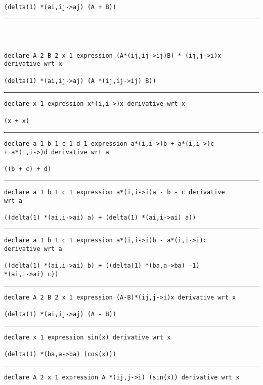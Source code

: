 \documentclass[12pt, a4paper]{report}
\begin{document}
\begin{multicols}{2}
\begin{verbatim}
(delta(1) *(ai,ij->aj) (A + B))
\end{verbatim}
\vspace{-20pt} \rule[-10pt]{\columnwidth}{0.1pt} 
\begin{verbatim}



declare A 2 B 2 x 1 expression (A*(ij,ij->ij)B) * (ij,j->i)x 
derivative wrt x

(delta(1) *(ai,ij->aj) (A *(ij,ij->ij) B))
\end{verbatim}
\vspace{-20pt} \rule[-10pt]{\columnwidth}{0.1pt} 
\begin{verbatim}
declare x 1 expression x*(i,i->)x derivative wrt x

(x + x)
\end{verbatim}
\vspace{-20pt} \rule[-10pt]{\columnwidth}{0.1pt} 
\begin{verbatim}
declare a 1 b 1 c 1 d 1 expression a*(i,i->)b + a*(i,i->)c 
+ a*(i,i->)d derivative wrt a

((b + c) + d)
\end{verbatim}
\vspace{-20pt} \rule[-10pt]{\columnwidth}{0.1pt} 
\begin{verbatim}
declare a 1 b 1 c 1 expression a*(i,i->i)a - b - c derivative 
wrt a

((delta(1) *(ai,i->ai) a) + (delta(1) *(ai,i->ai) a))
\end{verbatim}
\vspace{-20pt} \rule[-10pt]{\columnwidth}{0.1pt} 
\begin{verbatim}
declare a 1 b 1 c 1 expression a*(i,i->i)b - a*(i,i->i)c 
derivative wrt a

((delta(1) *(ai,i->ai) b) + ((delta(1) *(ba,a->ba) -1) 
*(ai,i->ai) c))
\end{verbatim}
\vspace{-20pt} \rule[-10pt]{\columnwidth}{0.1pt} 
\begin{verbatim}
declare A 2 B 2 x 1 expression (A-B)*(ij,j->i)x derivative wrt x

(delta(1) *(ai,ij->aj) (A - B))
\end{verbatim}
\vspace{-20pt} \rule[-10pt]{\columnwidth}{0.1pt} 
\begin{verbatim}
declare x 1 expression sin(x) derivative wrt x

(delta(1) *(ba,a->ba) (cos(x)))
\end{verbatim}
\vspace{-20pt} \rule[-10pt]{\columnwidth}{0.1pt} 
\begin{verbatim}
declare A 2 x 1 expression A *(ij,j->i) (sin(x)) derivative wrt x


\end{verbatim}
\end{multicols}
\end{document}
